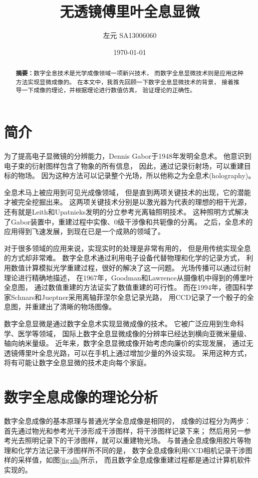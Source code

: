 \documentclass[11pt,a4paper]{article}
\title{无透镜傅里叶全息显微}
\author{左元 SA13006060}
\date{\today}
\begin{document}
\maketitle

\begin{abstract}
\noindent
\textbf{摘要：}数字全息技术是光学成像领域一项新兴技术，
而数字全息显微技术则是应用这种方法实现显微成像的。
在本文中，我首先回顾一下数字全息显微技术的背景，
接着推导一下成像的理论，并根据理论进行数值仿真，
验证理论的正确性。
\end{abstract}

\section{简介}
为了提高电子显微镜的分辨能力，Dennis Gabor于1948年发明全息术。
他意识到电子束的衍射图样包含了物象的所有信息，
因此，通过记录衍射场，可以重建目标的物场。
因为这种方法可以记录整个光场，所以他称之为全息术(holography)\cite{gabor1948new, kim2010principles}。

全息术马上被应用到可见光成像领域，
但是直到两项关键技术的出现，它的潜能才被完全挖掘出来。
这两项关键技术分别是以激光器为代表的理想的相干光源，
还有就是Leith和Upatnieks发明的分立参考光离轴照明技术\cite{leith1962reconstructed}。
这种照明方式解决了Gabor装置中，重建过程中实像、0级干涉像和共轭像的分离。
之后，全息术的应用得到飞速发展，到现在已是一个成熟的领域了。

对于很多领域的应用来说，实现实时的处理是非常有用的，
但是用传统实现全息的方式却非常难。
数字全息术通过利用电子设备代替物理和化学的记录方式，
利用数值计算模拟光学重建过程，很好的解决了这一问题。
光场传播可以通过衍射理论进行精确地描述，
在1967年，Goodman和Lawrence从摄像机中得到的傅里叶全息图，
通过数值重建的方法证实了数值重建的可行性\cite{goodman1967digital}。
而在1994年，德国科学家Schnars和Jueptner采用离轴菲涅尔全息记录光路，
用CCD记录了一个骰子的全息图，并重建出了清晰的物场图像\cite{schnars1994direct}。

数字全息显微是通过数字全息术实现显微成像的技术。
它被广泛应用到生命科学、医学等领域，
国际上数字全息显微成像的分辨率已经达到横向亚微米量级、轴向纳米量级\cite{kemper2008digital,marquet2005digital,mann2006quantitative}。
近年来，数字全息显微成像开始考虑向廉价的实现发展，
通过无透镜傅里叶全息光路，可以在手机上通过增加少量的外设实现\cite{breslauer2009mobile,tseng2010lensfree,vashist2014cellphone}。
采用这种方式，将有可能让数字全息显微的技术走向每个家庭。

\section{数字全息成像的理论分析}
数字全息成像的基本原理与普通光学全息成像是相同的，
成像的过程分为两步：首先通过物光和参考光干涉形成干涉图样，将干涉图样记录下来；
然后用另一参考光去照明记录下的干涉图样，就可以重建物光场。
与普通全息成像用胶片等物理和化学方法记录干涉图样所不同的是，
数字全息成像利用CCD相机记录干涉图样的采样值，如图\ref{fig:dh}所示，
而且数字全息成像重建过程都是通过计算机软件实现的。
\end{document}
